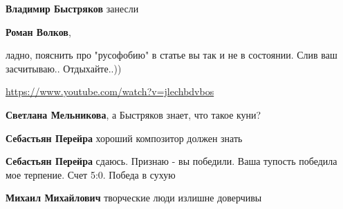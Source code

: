 \begin{itemize}
\begin{itemize}
 
\textbf{Владимир Быстряков} занесли

 
\textbf{Роман Волков}, 

ладно, пояснить про "русофобию" в статье вы так и не в состоянии. Слив ваш засчитываю.. Отдыхайте..)) 

\url{https://www.youtube.com/watch?v=jlechbdvbos}

 
\textbf{Светлана Мельникова}, а Быстряков знает, что такое куни?

 
\textbf{Себастьян Перейра} хороший композитор должен знать

 
\textbf{Себастьян Перейра} сдаюсь. Признаю - вы победили. Ваша тупость победила мое терпение.
Счет 5:0. Победа в сухую

 
\textbf{Михаил Михайлович} творческие люди излишне доверчивы

 

\end{itemize}
\end{itemize}
